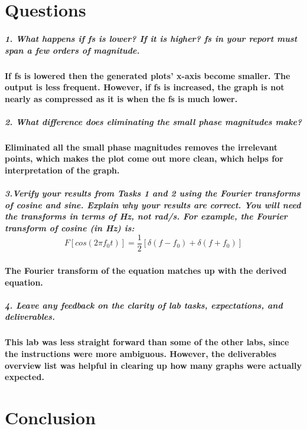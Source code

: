 \documentclass[12pt,a4paper]{article}
\begin{document}
\section{Questions}\label{sec:res}
\subparagraph{\large 1. What happens if fs is lower? If it is higher? fs in your report must span a few orders of
magnitude.}

\paragraph{If fs is lowered then the generated plots' x-axis become smaller. The output is less frequent. However, if fs is increased, the graph is not nearly as compressed as it is when the fs is much lower. }

\subparagraph{\large 2. What difference does eliminating the small phase magnitudes make? \newline}

\paragraph{Eliminated all the small phase magnitudes removes the irrelevant points, which makes the plot come out more clean, which helps for interpretation of the graph.}

\subparagraph{\large 3.Verify your results from Tasks 1 and 2 using the Fourier transforms of cosine and sine.
Explain why your results are correct. You will need the transforms in terms of Hz, not rad/s.
For example, the Fourier transform of cosine (in Hz) is: 
$$F[cos(2πf_0t)] =\frac{1}{2}[δ (f - f_0) + δ (f + f_0)]$$}

\paragraph{The Fourier transform of the equation matches up with the derived equation.}

\subparagraph{\large 4. Leave any feedback on the clarity of lab tasks, expectations, and deliverables.}

\paragraph{This lab was less straight forward than some of the other labs, since the instructions were more ambiguous. However, the deliverables overview list was helpful in clearing up how many graphs were actually expected.}

\section{Conclusion}\label{sec:res}
\end{document}

